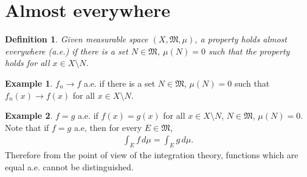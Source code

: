 \documentclass[11pt]{book}
\newtheorem{definition}{Definition}[chapter]
\theoremstyle{definition}
\newtheorem{example}{Example}[chapter]
\numberwithin{equation}{chapter}
\begin{document}
\section{Almost everywhere}

\begin{definition}
Given measurable space $(X,\mathfrak{M},\mu)$, a property holds almost everywhere (a.e.) if there is a set $N \in \mathfrak{M}$, $\mu(N) = 0$ such that the property holds for all $x \in X \setminus N$.
\end{definition}

\medskip

\begin{example}
$f_n \to f$ a.e. if there is a set $N \in \mathfrak{M}$, $\mu(N) = 0$ such that $f_n(x) \to f(x)$ for all $x \in X \setminus N$.
\end{example}

\medskip

\begin{example}
$f = g$ a.e. if $f(x) = g(x)$ for all $x \in X \setminus N$, $N \in \mathfrak{M}$, $\mu(N) = 0$. Note that if $f = g$ a.e, then for every $E \in \mathfrak{M}$,
\begin{align*}
    \int_E f\,d\mu = \int_E g\,d\mu.
\end{align*}
Therefore from the point of view of the integration theory, functions which are equal a.e. cannot be distinguished.
\end{example}

\medskip
\end{document}

